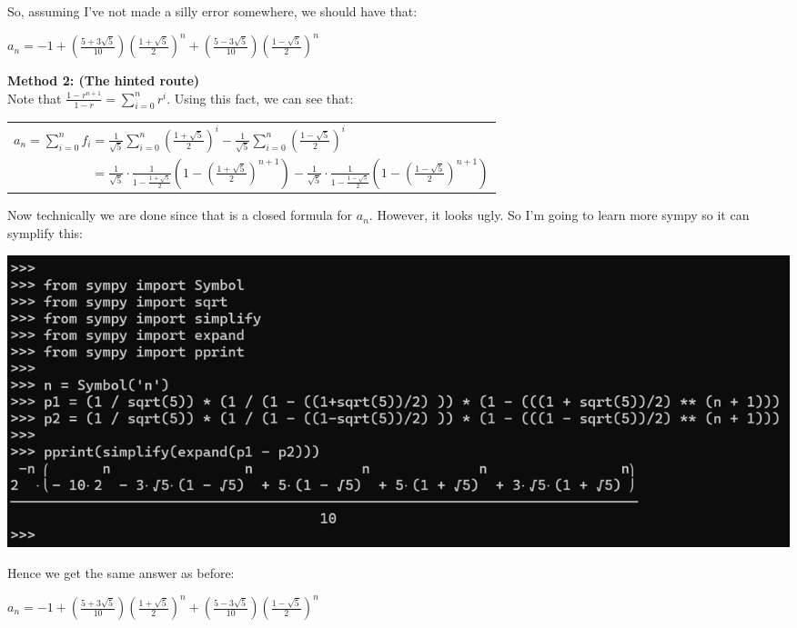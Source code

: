 \documentclass{book}
\newcommand{\exPP}{%
   \color{RedViolet}%
   \fontsize{12}{14}\selectfont%
}
\newenvironment{myIndent}{%
   \begin{adjustwidth}{2.5em}{0em}%
}{%
   \end{adjustwidth}%
}
\newcommand{\blab}[1]{\textbf{#1}}
\newcommand{\retTwo}{\hfill\bigbreak}
\begin{document}
\begin{itemize}
\begin{myIndent}
      So, assuming I've not made a silly error somewhere, we should have that:

      {\centering $a_n = -1 + \left(\frac{5 + 3\sqrt{5}}{10}\right)\left(\frac{1 + \sqrt{5}}{2}\right)^n + \left(\frac{5 - 3\sqrt{5}}{10}\right)\left(\frac{1 - \sqrt{5}}{2}\right)^n$ \retTwo\par}

      \blab{Method 2: (The hinted route)}\\
      Note that $\frac{1 - r^{n+1}}{1-r} = \sum\limits_{i=0}^n r^i$. Using this fact, we can see that:

      {\centering\exPP
      \begin{tabular}{l}
         $a_n = \sum\limits_{i = 0}^n f_i = \frac{1}{\sqrt{5}}\sum\limits_{i = 0}^n\left(\frac{1 + \sqrt{5}}{2}\right)^i - \frac{1}{\sqrt{5}}\sum\limits_{i = 0}^n\left(\frac{1 - \sqrt{5}}{2}\right)^i$ \\ [10pt]
         $\phantom{a_n = \sum\limits_{i = 0}^n f_i} = \frac{1}{\sqrt{5}}\cdot \frac{1}{1 - \frac{1 + \sqrt{5}}{2}}\left(1 - (\frac{1 + \sqrt{5}}{2})^{n + 1}\right) - \frac{1}{\sqrt{5}}\cdot \frac{1}{1 - \frac{1 - \sqrt{5}}{2}}\left(1 - (\frac{1 - \sqrt{5}}{2})^{n + 1}\right)$
      \end{tabular}\retTwo\par}

      Now technically we are done since that is a closed formula for $a_n$. However, it looks ugly. So I'm going to learn more sympy so it can symplify this:

      {\centering\includegraphics[scale=0.58]{188-HW1_Q3B.png}\retTwo\par}

      Hence we get the same answer as before:

      {\centering $a_n = -1 + \left(\frac{5 + 3\sqrt{5}}{10}\right)\left(\frac{1 + \sqrt{5}}{2}\right)^n + \left(\frac{5 - 3\sqrt{5}}{10}\right)\left(\frac{1 - \sqrt{5}}{2}\right)^n $ \retTwo\par}
   \end{myIndent}
\end{itemize}
\end{document}
